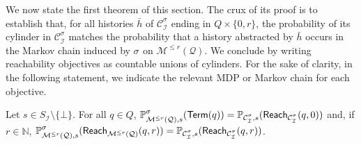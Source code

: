 \documentclass[a4paper,UKenglish,cleveref,autoref,thm-restate,colorlinks]{lipics-v2021}
\newcommand{\IN}{\mathbb{N}}
\newcommand{\mdp}{\mathcal{M}}
\newcommand{\mdpStateSpace}{S}
\newcommand{\hist}{h}
\newcommand{\ocmdp}{\mathcal{Q}}
\newcommand{\ocmdpFin}[2]{\mdp^{\leq #2}(#1)}
\newcommand{\ocStateSpace}{Q}
\newcommand{\ocState}{q}
\newcommand{\ocConfig}{s}
\newcommand{\counterUB}{r}
\newcommand{\mchain}{\mathcal{C}}
\newcommand{\intPart}{\mathcal{I}}
\newcommand{\compressChainStrat}[1]{\mchain^{#1}_{\intPart}}
\newcommand{\compressChain}{\compressChainStrat{\strat}}
\newcommand{\compressChainStateSpace}{\mdpStateSpace_{\intPart}}
\newcommand{\mcHist}{\bar{\hist}}
\newcommand{\reachVerb}[2]{\mathsf{Reach}_{#1}(#2)}
\newcommand{\termination}{\mathsf{Term}}
\newcommand{\selectiveTermination}[1]{\termination({#1})}
\newcommand{\stratGeneric}[1]{{\sigma_{#1}}}
\newcommand{\strat}{\stratGeneric{}}
\begin{document}
We now state the first theorem of this section.
The crux of its proof is to establish that, for all histories $\mcHist$ of $\compressChain$ ending in $\ocStateSpace\times\{0, \counterUB\}$, the probability of its cylinder in $\compressChain$ matches the probability that a history abstracted by $\mcHist$ occurs in the Markov chain induced by $\strat$ on $\ocmdpFin{\ocmdp}{\counterUB}$.
We conclude by writing reachability objectives as countable unions of cylinders.
For the sake of clarity, in the following statement, we indicate the relevant MDP or Markov chain for each objective.
\begin{theorem}\label{theorem:ocmdp:probability matching}
  Let $\ocConfig \in\compressChainStateSpace\setminus\{\bot\}$.
  For all $\ocState\in\ocStateSpace$, $\probaGverb{\ocmdpFin{\ocmdp}{\counterUB}}{\ocConfig}{\strat}(\selectiveTermination{\ocState}) = \probaMCverb{\compressChain}{\ocConfig}(\reachVerb{\compressChain}{\ocState, 0})$ and,
  if $\counterUB\in\IN$, $\probaGverb{\ocmdpFin{\ocmdp}{\counterUB}}{\ocConfig}{\strat}(\reachVerb{\ocmdpFin{\ocmdp}{\counterUB}}{\ocState, \counterUB}) = \probaMCverb{\compressChain}{\ocConfig}(\reachVerb{\compressChain}{\ocState, \counterUB})$.
\end{theorem}
\end{document}
